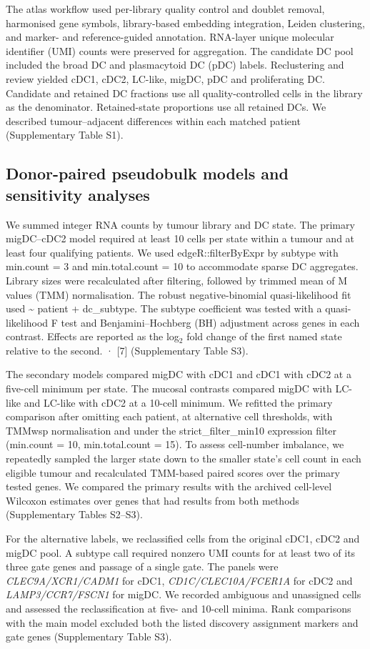 \documentclass[11pt,a4paper]{article}
\begin{document}
The atlas workflow used per-library quality control and doublet removal, harmonised gene symbols, library-based embedding integration, Leiden clustering, and marker- and reference-guided annotation. RNA-layer unique molecular identifier (UMI) counts were preserved for aggregation. The candidate DC pool included the broad DC and plasmacytoid DC (pDC) labels. Reclustering and review yielded cDC1, cDC2, LC-like, migDC, pDC and proliferating DC. Candidate and retained DC fractions use all quality-controlled cells in the library as the denominator. Retained-state proportions use all retained DCs. We described tumour--adjacent differences within each matched patient (Supplementary Table S1).

\subsection{Donor-paired pseudobulk models and sensitivity analyses}
We summed integer RNA counts by tumour library and DC state. The primary migDC--cDC2 model required at least 10 cells per state within a tumour and at least four qualifying patients. We used edgeR::filterByExpr by subtype with min.count = 3 and min.total.count = 10 to accommodate sparse DC aggregates. Library sizes were recalculated after filtering, followed by trimmed mean of M values (TMM) normalisation. The robust negative-binomial quasi-likelihood fit used \textasciitilde{} patient + dc\_subtype. The subtype coefficient was tested with a quasi-likelihood F test and Benjamini--Hochberg (BH) adjustment across genes in each contrast. Effects are reported as the log$_{2}$ fold change of the first named state relative to the second. · [7] (Supplementary Table S3).

The secondary models compared migDC with cDC1 and cDC1 with cDC2 at a five-cell minimum per state. The mucosal contrasts compared migDC with LC-like and LC-like with cDC2 at a 10-cell minimum. We refitted the primary comparison after omitting each patient, at alternative cell thresholds, with TMMwsp normalisation and under the strict\_filter\_min10 expression filter (min.count = 10, min.total.count = 15). To assess cell-number imbalance, we repeatedly sampled the larger state down to the smaller state's cell count in each eligible tumour and recalculated TMM-based paired scores over the primary tested genes. We compared the primary results with the archived cell-level Wilcoxon estimates over genes that had results from both methods (Supplementary Tables S2--S3).

For the alternative labels, we reclassified cells from the original cDC1, cDC2 and migDC pool. A subtype call required nonzero UMI counts for at least two of its three gate genes and passage of a single gate. The panels were \textit{CLEC9A}\textit{/}\textit{XCR1}\textit{/}\textit{CADM1} for cDC1, \textit{CD1C}\textit{/}\textit{CLEC10A}\textit{/}\textit{FCER1A} for cDC2 and \textit{LAMP3}\textit{/}\textit{CCR7}\textit{/}\textit{FSCN1} for migDC. We recorded ambiguous and unassigned cells and assessed the reclassification at five- and 10-cell minima. Rank comparisons with the main model excluded both the listed discovery assignment markers and gate genes (Supplementary Table S3).
\end{document}
